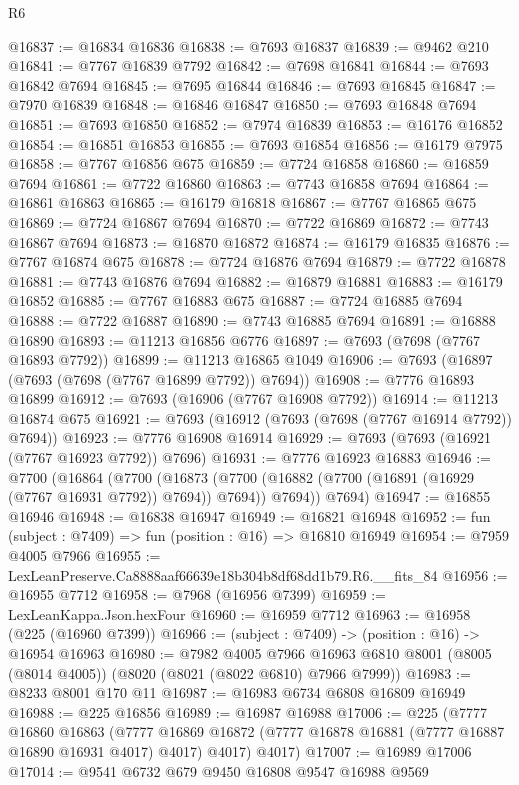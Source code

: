 \begin{lexlean}{R6}
\begin{coremodule}
@16837 := @16834 @16836
@16838 := @7693 @16837
@16839 := @9462 @210
@16841 := @7767 @16839 @7792
@16842 := @7698 @16841
@16844 := @7693 @16842 @7694
@16845 := @7695 @16844
@16846 := @7693 @16845
@16847 := @7970 @16839
@16848 := @16846 @16847
@16850 := @7693 @16848 @7694
@16851 := @7693 @16850
@16852 := @7974 @16839
@16853 := @16176 @16852
@16854 := @16851 @16853
@16855 := @7693 @16854
@16856 := @16179 @7975
@16858 := @7767 @16856 @675
@16859 := @7724 @16858
@16860 := @16859 @7694
@16861 := @7722 @16860
@16863 := @7743 @16858 @7694
@16864 := @16861 @16863
@16865 := @16179 @16818
@16867 := @7767 @16865 @675
@16869 := @7724 @16867 @7694
@16870 := @7722 @16869
@16872 := @7743 @16867 @7694
@16873 := @16870 @16872
@16874 := @16179 @16835
@16876 := @7767 @16874 @675
@16878 := @7724 @16876 @7694
@16879 := @7722 @16878
@16881 := @7743 @16876 @7694
@16882 := @16879 @16881
@16883 := @16179 @16852
@16885 := @7767 @16883 @675
@16887 := @7724 @16885 @7694
@16888 := @7722 @16887
@16890 := @7743 @16885 @7694
@16891 := @16888 @16890
@16893 := @11213 @16856 @6776
@16897 := @7693 (@7698 (@7767 @16893 @7792))
@16899 := @11213 @16865 @1049
@16906 := @7693 (@16897 (@7693 (@7698 (@7767 @16899 @7792)) @7694))
@16908 := @7776 @16893 @16899
@16912 := @7693 (@16906 (@7767 @16908 @7792))
@16914 := @11213 @16874 @675
@16921 := @7693 (@16912 (@7693 (@7698 (@7767 @16914 @7792)) @7694))
@16923 := @7776 @16908 @16914
@16929 := @7693 (@7693 (@16921 (@7767 @16923 @7792)) @7696)
@16931 := @7776 @16923 @16883
@16946 := @7700
    (@16864
      (@7700
        (@16873 (@7700 (@16882 (@7700 (@16891 (@16929 (@7767 @16931 @7792)) @7694)) @7694)) @7694))
      @7694)
@16947 := @16855 @16946
@16948 := @16838 @16947
@16949 := @16821 @16948
@16952 := fun (subject : @7409) => fun (position : @16) => @16810 @16949
@16954 := @7959 @4005 @7966
@16955 := LexLeanPreserve.Ca8888aaf66639e18b304b8df68dd1b79.R6.__fits_84
@16956 := @16955 @7712
@16958 := @7968 (@16956 @7399)
@16959 := LexLeanKappa.Json.hexFour
@16960 := @16959 @7712
@16963 := @16958 (@225 (@16960 @7399))
@16966 := (subject : @7409) -> (position : @16) -> @16954 @16963
@16980 := @7982
    @4005
    @7966
    @16963
    @6810
    @8001
    (@8005 (@8014 @4005))
    (@8020 (@8021 (@8022 @6810) @7966 @7999))
@16983 := @8233 @8001 @170 @11
@16987 := @16983 @6734 @6808 @16809 @16949
@16988 := @225 @16856
@16989 := @16987 @16988
@17006 := @225
    (@7777
      @16860
      @16863
      (@7777 @16869 @16872 (@7777 @16878 @16881 (@7777 @16887 @16890 @16931 @4017) @4017) @4017)
      @4017)
@17007 := @16989 @17006
@17014 := @9541 @6732 @679 @9450 @16808 @9547 @16988 @9569

\end{coremodule}
\end{lexlean}
